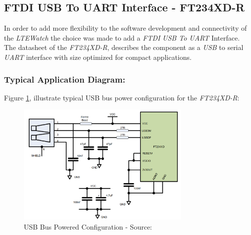\documentclass[report.tex]{subfiles}
\begin{document}
\pagebreak
\subsection{FTDI USB To UART Interface - FT234XD-R}
In order to add more flexibility to the software development and connectivity of the \textit{LTEWatch} the choice was made to add a \textit{FTDI} \textit{USB To UART} Interface. The datasheet of the \textit{FT234XD-R}\cite{FTDIUSB}, describes the component as a \textit{USB} to serial \textit{UART} interface with size optimized for compact applications. 

\subsubsection{Typical Application Diagram:} \label{sec:ftdi_usb_app}

Figure \ref{fig:FTDIUSB_usb_pwr}, illustrate typical USB bus power configuration for the \textit{ FT234XD-R}:

\begin{figure}[H]
	\centering
	\includegraphics[width=0.75\textwidth]{Include/Figure/comp/FT234XD_R_USB_PWR.png}
	\caption{USB Bus Powered Configuration - Source: \cite{FTDIUSB}}
	\label{fig:FTDIUSB_usb_pwr}
\end{figure}
\end{document}
